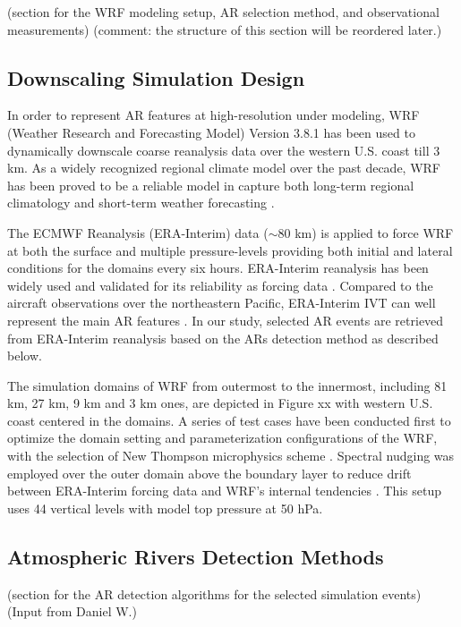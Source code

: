 \documentclass[draft,ms]{agutex}   %
\begin{document}
\begin{article}
(section for the WRF modeling setup, AR selection method, and observational measurements) (comment: the structure of this section will be reordered later.)

\subsection{Downscaling Simulation Design}

In order to represent AR features at high-resolution under modeling, WRF (Weather Research and Forecasting Model) \citep{skamarock2008time} Version 3.8.1 has been used to dynamically downscale coarse reanalysis data over the western U.S. coast till 3 km. As a widely recognized regional climate model over the past decade, WRF has been proved to be a reliable model in capture both long-term regional climatology and short-term weather forecasting \citep{leung2009atmospheric, soares2012wrf, sun2015hybrid}.

The ECMWF Reanalysis (ERA-Interim) data ($\sim$80 km) is applied to force WRF at both the surface and multiple pressure-levels providing both initial and lateral conditions for the domains every six hours. ERA-Interim reanalysis has been widely used and validated for its reliability as forcing data \citep{dee2011era}. Compared to the aircraft observations over the northeastern Pacific, ERA-Interim IVT can well represent the main AR features \citep{ralph2012atmospheric}. In our study, selected AR events are retrieved from ERA-Interim reanalysis based on the ARs detection method as described below.

The simulation domains of WRF from outermost to the innermost, including 81 km, 27 km, 9 km and 3 km ones, are depicted in Figure xx with western U.S. coast centered in the domains. A series of test cases have been conducted first to optimize the domain setting and parameterization configurations of the WRF, with the selection of New Thompson microphysics scheme \citep{thompson2008explicit}. Spectral nudging was employed over the outer domain above the boundary layer to reduce drift between ERA-Interim forcing data and WRF's internal tendencies \citep{von2000spectral}. This setup uses 44 vertical levels with model top pressure at 50 hPa.

\subsection{Atmospheric Rivers Detection Methods}

(section for the AR detection algorithms for the selected simulation events) {\color{red}(Input from Daniel W.)}


\end{article}
\end{document}
